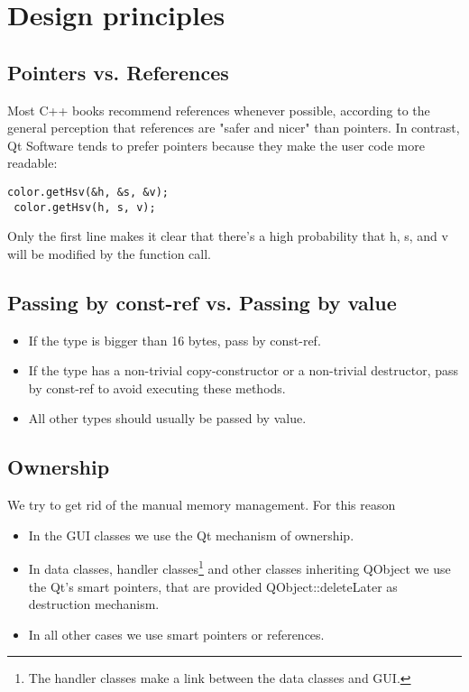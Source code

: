\documentclass[a4paper,12pt]{article}
\begin{document}
\clearpage
\newpage

\section{Design principles}\label{sec:design}
\subsection{Pointers vs. References}
Most C++ books recommend references whenever possible, according to the general perception that references are "safer and nicer" than pointers. In contrast, Qt Software tends to prefer pointers because they make the user code more readable:
\begin{lstlisting}[breaklines]
 color.getHsv(&h, &s, &v);
 color.getHsv(h, s, v);
 \end{lstlisting}
Only the first line makes it clear that there's a high probability that h, s, and v will be modified by the function call.

\subsection{Passing by const-ref vs. Passing by value}
\begin{itemize}
\item If the type is bigger than 16 bytes, pass by const-ref.
\item If the type has a non-trivial copy-constructor or a non-trivial destructor, pass by const-ref to avoid executing these methods.
\item All other types should usually be passed by value.
\end{itemize}


\subsection{Ownership}
We try to get rid of the manual memory management. For this reason
\begin{itemize}
\item In the GUI classes we use the Qt mechanism of ownership.
\item In data classes, handler classes\footnote{The handler classes make a link between the data classes and GUI.} and other classes inheriting QObject we use the Qt's smart pointers, that are provided QObject::deleteLater as destruction mechanism.
\item In all other cases we use smart pointers or references. 

\end{itemize}
\end{document}
